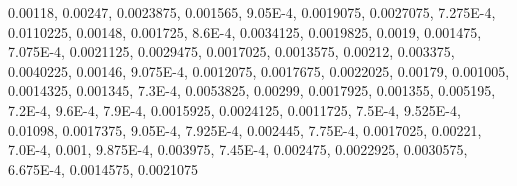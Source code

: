 0.00118, 0.00247, 0.0023875, 0.001565, 9.05E-4, 0.0019075, 0.0027075, 7.275E-4, 0.0110225, 0.00148, 0.001725, 8.6E-4, 0.0034125, 0.0019825, 0.0019, 0.001475, 7.075E-4, 0.0021125, 0.0029475, 0.0017025, 0.0013575, 0.00212, 0.003375, 0.0040225, 0.00146, 9.075E-4, 0.0012075, 0.0017675, 0.0022025, 0.00179, 0.001005, 0.0014325, 0.001345, 7.3E-4, 0.0053825, 0.00299, 0.0017925, 0.001355, 0.005195, 7.2E-4, 9.6E-4, 7.9E-4, 0.0015925, 0.0024125, 0.0011725, 7.5E-4, 9.525E-4, 0.01098, 0.0017375, 9.05E-4, 7.925E-4, 0.002445, 7.75E-4, 0.0017025, 0.00221, 7.0E-4, 0.001, 9.875E-4, 0.003975, 7.45E-4, 0.002475, 0.0022925, 0.0030575, 6.675E-4, 0.0014575, 0.0021075